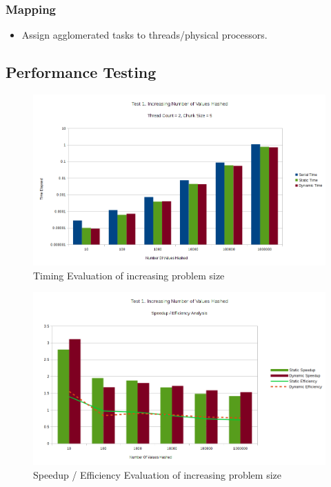 \documentclass{article}
\begin{document}
\subsubsection{Mapping}
        \begin{itemize}
            \item Assign agglomerated tasks to threads/physical processors.
        \end{itemize}


\subsection{Performance Testing}
\begin{figure}
  \caption{Timing Evaluation of increasing problem size}
  \centering
  \includegraphics[width=\textwidth]{chart1a}
\end{figure}

\begin{figure}
  \caption{Speedup / Efficiency Evaluation of increasing problem size}
  \centering
  \includegraphics[width=\textwidth]{chart1b}
\end{figure}
\end{document}
